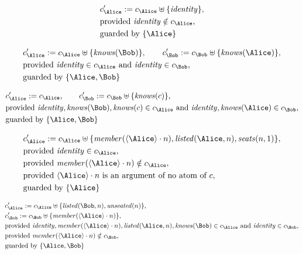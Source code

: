 \begin{align*}
&
c'_
{
\Alice
}
 := 
c_
{
\Alice
}
 \uplus 
\{
\mathit{
identity
}
\}
,\\
&
\text{provided } 
\mathit{
identity
}
 \notin c_
{
\Alice
}
,\\
&
\text{guarded by } \{
\Alice
\}
\end{align*}

\begin{align*}
&
c'_
{
\Alice
}
 := 
c_
{
\Alice
}
 \uplus 
\{
\mathit{
knows
}
(
\Bob
)
\}
, \qquad 
c'_
{
\Bob
}
 := 
c_
{
\Bob
}
 \uplus 
\{
\mathit{
knows
}
(
\Alice
)
\}
,\\
&
\text{provided } 
\mathit{
identity
}
 \in c_
{
\Alice
}
 \text{ and } 
\mathit{
identity
}
 \in c_
{
\Bob
}
,\\
&
\text{guarded by } \{
\Alice
,
\Bob
\}
\end{align*}

\begin{align*}
&
c'_
{
\Alice
}
 := 
c_
{
\Alice
}
, \qquad 
c'_
{
\Bob
}
 := 
c_
{
\Bob
}
 \uplus 
\{
\mathit{
knows
}
(
c
)
\}
,\\
&
\text{provided } 
\mathit{
identity
}
,
\mathit{
knows
}
(
\Bob
)
,
\mathit{
knows
}
(
c
)
 \in c_
{
\Alice
}
 \text{ and } 
\mathit{
identity
}
,
\mathit{
knows
}
(
\Alice
)
 \in c_
{
\Bob
}
,\\
&
\text{guarded by } \{
\Alice
,
\Bob
\}
\end{align*}

\begin{align*}
&
c'_
{
\Alice
}
 := 
c_
{
\Alice
}
 \uplus 
\{
\mathit{
member
}
(
\langle
\Alice
\rangle
\cdot
n
)
,
\mathit{
listed
}
(
\Alice
,
n
)
,
\mathit{
seats
}
(
n
,
1
)
\}
,\\
&
\text{provided } 
\mathit{
identity
}
 \in c_
{
\Alice
}
,\\
&
\text{provided } 
\mathit{
member
}
(
\langle
\Alice
\rangle
\cdot
n
)
 \notin c_
{
\Alice
}
,\\
&
\text{provided } 
\langle
\Alice
\rangle
\cdot
n
 \text{ is an argument of no atom of } c
,\\
&
\text{guarded by } \{
\Alice
\}
\end{align*}

\begin{align*}
&
c'_
{
\Alice
}
 := 
c_
{
\Alice
}
 \uplus 
\{
\mathit{
listed
}
(
\Bob
,
n
)
,
\mathit{
unseated
}
(
n
)
\}
,\\
&
c'_
{
\Bob
}
 := 
c_
{
\Bob
}
 \uplus 
\{
\mathit{
member
}
(
\langle
\Alice
\rangle
\cdot
n
)
\}
,\\
&
\text{provided } 
\mathit{
identity
}
,
\mathit{
member
}
(
\langle
\Alice
\rangle
\cdot
n
)
,
\mathit{
listed
}
(
\Alice
,
n
)
,
\mathit{
knows
}
(
\Bob
)
 \in c_
{
\Alice
}
 \text{ and } 
\mathit{
identity
}
 \in c_
{
\Bob
}
,\\
&
\text{provided } 
\mathit{
member
}
(
\langle
\Alice
\rangle
\cdot
n
)
 \notin c_
{
\Bob
}
,\\
&
\text{guarded by } \{
\Alice
,
\Bob
\}
\end{align*}
